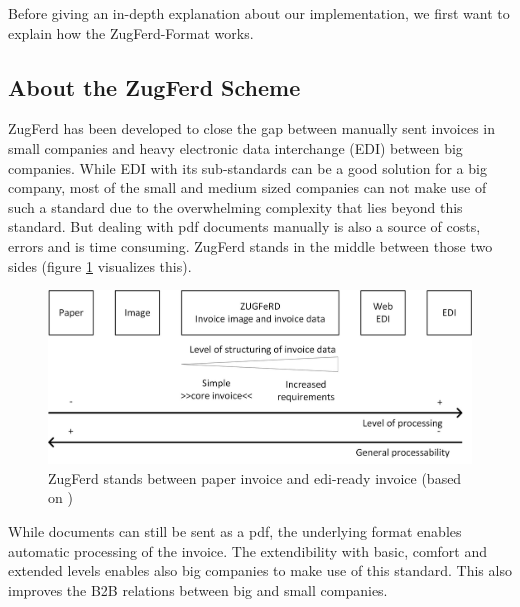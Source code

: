 Before giving an in-depth explanation about our implementation, we first want to explain how the ZugFerd-Format works.

\subsection{About the ZugFerd Scheme}
\label{sec5.7.1}

ZugFerd has been developed to close the gap between manually sent invoices in small companies and heavy electronic data interchange (EDI) between big companies. While EDI with its sub-standards can be a good solution for a big company, most of the small and medium sized companies can not make use of such a standard due to the overwhelming complexity that lies beyond this standard. But dealing with pdf documents manually is also a source of costs, errors and is time consuming. ZugFerd stands in the middle between those two sides (figure \ref{zugFerdImage} visualizes this).
\begin{figure}[htb!]
\centering
\includegraphics[width=\textwidth]{Images/ZugFerd/ZugFerd_English.jpg}
\caption{ZugFerd stands between paper invoice and edi-ready invoice (based on \cite[page 13]{zugFerdSpecificationEnglish})  \label{zugFerdImage}}
\end{figure}

While documents can still be sent as a pdf, the underlying format enables automatic processing of the invoice. The extendibility with basic, comfort and extended levels enables also big companies to make use of this standard. This also improves the B2B relations between big and small companies.

